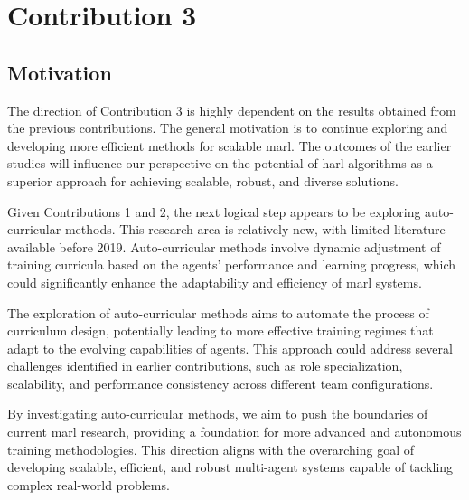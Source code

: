\section{Contribution 3}

\subsection{Motivation}
The direction of Contribution 3 is highly dependent on the results obtained 
from the previous contributions. The general motivation is to 
continue exploring and developing more efficient methods for scalable \gls{marl}. 
The outcomes of the earlier studies will influence our perspective on the potential of 
\gls{harl} algorithms as a superior approach for achieving scalable, robust, and diverse solutions.

Given Contributions 1 and 2, the next logical step appears to be exploring auto-curricular methods. 
This research area is relatively new, with limited literature available before 2019. 
Auto-curricular methods involve dynamic adjustment of training curricula based on the agents' 
performance and learning progress, which could significantly enhance the adaptability and 
efficiency of \gls{marl} systems.

The exploration of auto-curricular methods aims to automate the process of curriculum design, 
potentially leading to more effective training regimes that adapt to the evolving capabilities of 
agents. This approach could address several challenges identified in earlier contributions, 
such as role specialization, scalability, and performance consistency across different team 
configurations.

By investigating auto-curricular methods, we aim to push the boundaries of current \gls{marl} 
research, providing a foundation for more advanced and autonomous training methodologies. 
This direction aligns with the overarching goal of developing scalable, efficient, and 
robust multi-agent systems capable of tackling complex real-world problems.